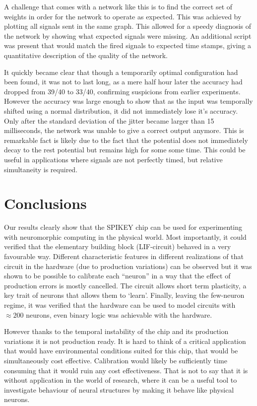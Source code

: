 \documentclass[a4paper,twocolumn]{article}
\begin{document}
A challenge that comes with a network like this is to find the correct set of
weights in order for the network to operate as expected. This was achieved by
plotting all signals sent in the same graph. This allowed for a speedy diagnosis
of the network by showing what expected signals were missing. An additional
script was present that would match the fired signals to expected time stamps,
giving a quantitative description of the quality of the network.

It quickly became clear that though a temporarily optimal configuration had been
found, it was not to last long, as a mere half hour later the accuracy had
dropped from 39/40 to 33/40, confirming suspicions from earlier experiments.
However the accuracy was large enough to show that as the input was temporally
shifted using a normal distribution, it did not immediately lose it's accuracy.
Only after the standard deviation of the jitter became larger than 15
milliseconds, the network was unable to give a correct output anymore. This is
remarkable fact is likely due to the fact that the potential does not
immediately decay to the rest potential but remains high for some some time.
This could be useful in applications where signals are not perfectly timed, but
relative simultaneity is required.

\section{Conclusions}
Our results clearly show that the SPIKEY chip can be used for experimenting with
neuromorphic computing in the physical world. Most importantly, it could
verified that the elementary building block (LIF-circuit) behaved in a very
favourable way. Different characteristic features in different realizations of
that circuit in the hardware (due to production variations) can be observed but
it was shown to be possible to calibrate each  ``neuron'' in a way that the
effect of production errors is mostly cancelled. The circuit allows short term
plasticity,  a key trait of neurons that allows them to `learn'.  Finally,
leaving the few-neuron regime, it was verified that the hardware can be used to
model circuits with $\approx 200$ neurons, even binary logic was achievable with
the hardware.

However thanks to the temporal instability of the chip and its production
variations it is not production ready. It is hard to think of a critical
application that would have environmental conditions suited for this chip, that
would be simultaneously cost effective. Calibration would likely be sufficiently
time consuming that it would ruin any cost effectiveness. That is not to say
that it is without application in the world of research, where it can be a
useful tool to investigate behaviour of neural structures by making it behave
like physical neurons.
\end{document}
